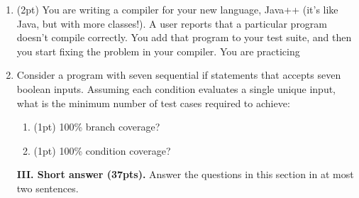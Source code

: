 \documentclass{report}
\newif\ifkey
\newcommand{\answershort}[1]{\ifkey\color{red}\underline{\textbf{#1}}\color{black}\else\underline{\hspace{3in}}\fi\xspace}
\newcommand{\answerlong}[1]{\ifkey\color{red}\textbf{#1}\color{black}\else\vspace{0.5in}\fi\xspace}
\newcommand{\shortpts}{37}
\newcommand*{\pts}[1]{\addtocounter{points}{#1}(#1pt)}
\begin{document}
\begin{spacing}{1.4}
\begin{enumerate}[leftmargin=*]
   \item \pts{2} You are writing a compiler for your new language, Java++ (it's like Java, but with more classes!).
     A user reports that a particular program doesn't compile correctly. You add that program to your test suite,
     and then you start fixing the problem in your compiler. You are practicing
     \\ \answershort{test-driven development}

\item Consider a program with seven sequential if statements that accepts seven boolean
inputs. Assuming each condition evaluates a single unique input, what is the minimum
number of test cases required to achieve:
\begin{enumerate}
\item \pts{1} 100\% branch coverage? \answershort{2: one all false, one all true}
\item \pts{1} 100\% condition coverage? \answershort{14 = 2*7}
\end{enumerate}

     
  \newpage

  \textbf{III. Short answer (\shortpts pts).} Answer the questions in this section in at most two sentences.






\end{enumerate}
\end{spacing}
\end{document}
